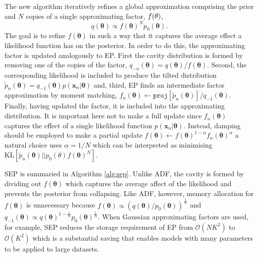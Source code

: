 The new algorithm iteratively refines a global approximation comprising the prior and $N$ copies of a single approximating factor, $f(\bf{\theta})$, %
%
\begin{equation}
q(\bm{\theta}) \propto f(\bm{\theta})^N p_0(\bm{\theta}).
\end{equation}
%
The goal is to refine $f(\bm{\theta})$ in such a way that it captures the average effect a likelihood function has on the posterior. In order to do this, the approximating factor is updated analogously to EP. First the cavity distribution is formed by removing one of the copies of the factor, $q_{-n}(\bm{\theta}) =q(\bm{\theta})/f(\bm{\theta})$. 
Second, the corresponding likelihood is included to produce the tilted distribution $\tilde{p}_n(\bm{\theta}) = q_{-1}(\bm{\theta}) p(\bm{x}_n | \bm{\theta})$ and, third, EP finds an intermediate factor approximation by moment matching, $f_n(\bm{\theta}) \leftarrow \mathtt{proj}[\tilde{p}_n(\bm{\theta})] / q_{-1}(\bm{\theta}) $. Finally, having updated the factor, it is included into the approximating distribution. It is important here not to make a full update since $f_n(\bm{\theta})$ captures the effect of a single likelihood function  $p(\bm{x}_n | \bm{\theta})$. Instead, damping should be employed to make a partial update $f(\bm{\theta}) \leftarrow f(\bm{\theta})^{1 - \alpha} f_n(\bm{\theta})^{\alpha}$ a natural choice uses $\alpha = 1/N$ which can be interpreted as minimising  $\mathrm{KL}[\tilde{p}_n(\bm{\theta}) || p_{0}(\theta)  f(\bm{\theta})^N]$.

SEP is summaried in Algorithm \ref{alg:sep}. Unlike ADF, the cavity is formed by dividing out $f(\bm{\theta})$ which captures the average affect of the likelihood and prevents the posterior from collapsing. Like ADF, however, memory allocation for $f(\bm{\theta})$ is unnecessary because $f(\bm{\theta}) \propto (q(\bm{\theta}) / p_0(\bm{\theta}))^{\frac{1}{N}}$ and $q_{-1}(\bm{\theta}) \propto q(\bm{\theta})^{1 - \frac{1}{N}} p_0(\bm{\theta})^{\frac{1}{N}}$. When Gaussian approximating factors are used, for example, SEP reduces the storage requirement of EP from  $\mathcal{O}(NK^2)$ to $\mathcal{O}(K^2)$ which is a substantial saving that enables models with many parameters to be applied to large datasets. 

